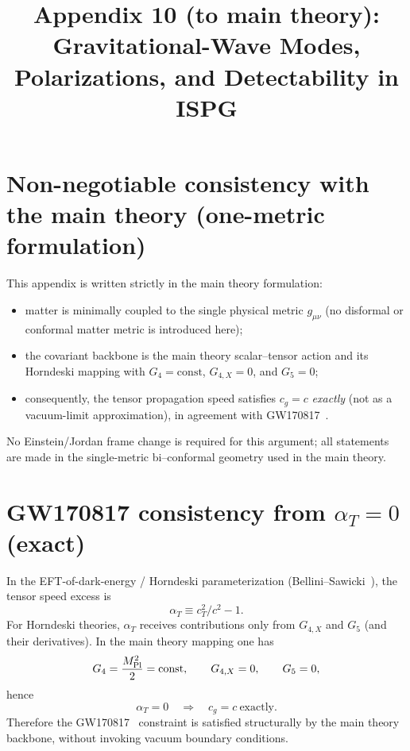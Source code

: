 \documentclass[11pt]{article}
\title{Appendix 10 (to main theory): Gravitational-Wave Modes, Polarizations, and Detectability in ISPG}
\author{}
\date{}
\begin{document}
\let\phi\varphi
\maketitle

\section*{Non-negotiable consistency with the main theory (one-metric formulation)}
This appendix is written strictly in the main theory formulation:
\begin{itemize}
\item matter is minimally coupled to the single physical metric $g_{\mu\nu}$ (no disformal or conformal matter metric is introduced here);
\item the covariant backbone is the main theory scalar--tensor action and its Horndeski mapping with $G_4=\mathrm{const}$, $G_{4,X}=0$, and $G_5=0$;
\item consequently, the tensor propagation speed satisfies $c_g=c$ \emph{exactly} (not as a vacuum-limit approximation), in agreement with GW170817~\cite{LIGO_GW170817}.
\end{itemize}
No Einstein/Jordan frame change is required for this argument; all statements are made in the single-metric bi--conformal geometry used in the main theory.

\section{GW170817 consistency from $\alpha_T=0$ (exact)}\label{sec:alphaT}
In the EFT-of-dark-energy / Horndeski parameterization (Bellini--Sawicki~\cite{BelliniSawicki2014}), the tensor speed excess is
\begin{equation}
\alpha_T \equiv c_T^2/c^2 - 1.
\end{equation}
For Horndeski theories, $\alpha_T$ receives contributions only from $G_{4,X}$ and $G_5$ (and their derivatives). In the main theory mapping one has
\begin{equation}
G_4=\frac{M_{\rm Pl}^2}{2}=\mathrm{const},\qquad G_{4,X}=0,\qquad G_5=0,
\label{eq:G4G5}
\end{equation}
hence
\begin{equation}
\alpha_T=0\quad\Rightarrow\quad c_g=c\ \text{exactly}.
\label{eq:cg_app10}
\end{equation}
Therefore the GW170817~\cite{LIGO_GW170817} constraint is satisfied structurally by the main theory backbone, without invoking vacuum boundary conditions.
\end{document}
